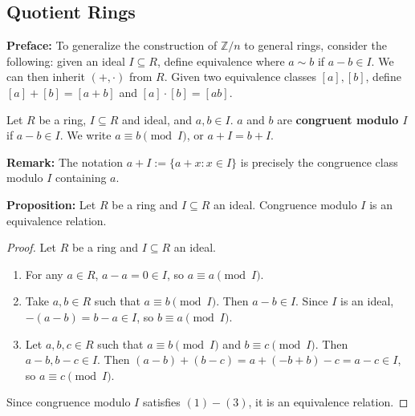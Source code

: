 \documentclass [12pt] {article}
\newcommand{\Z}{\mathbb{Z}}
\newenvironment{definition}[1]{\begin{tcolorbox}[title={Definition: #1},colback=blue!5!white,colframe=black!75!blue]}{\end{tcolorbox}}
\renewcommand{\bf}[1]{\textbf{{#1}}}
\begin{document}
\subsection{Quotient Rings}
\bf{Preface:} To generalize the construction of $\Z/n$ to general rings, consider the following:
given an ideal $I \subseteq R$, define equivalence where $a \sim b$ if $a - b \in I$. We
can then inherit $(+, \cdot)$ from $R$. Given two equivalence classes $[a], [b]$, define
$[a] + [b] = [a + b]$ and $[a] \cdot [b] = [ab]$.
\begin{definition}{Congruent Modulo $I$}
    Let $R$ be a ring, $I \subseteq R$ and ideal, and $a, b \in I$. $a$ and $b$ are \bf{congruent
    modulo $I$} if $a - b \in I$. We write $a \equiv b \pmod{I}$, or $a + I = b + I$.
    \vspace{0.5em}

    \bf{Remark:} The notation $a + I := \{ a + x : x \in I \}$ is precisely the congruence class modulo
    $I$ containing $a$.
\end{definition}
\bf{Proposition:} Let $R$ be a ring and $I \subseteq R$ an ideal. Congruence modulo $I$ is an
equivalence relation.
\begin{proof}
    Let $R$ be a ring and $I \subseteq R$ an ideal.
    \begin{enumerate}[label=(\arabic*)]
        \item For any $a \in R$, $a - a = 0 \in I$, so $a \equiv a \pmod{I}$.
        \item Take $a, b \in R$ such that $a \equiv b \pmod{I}$. Then $a - b \in I$. Since $I$ is an
            ideal, $-(a - b) = b - a \in I$, so $b \equiv a \pmod{I}$.
        \item Let $a, b, c \in R$ such that $a \equiv b \pmod{I}$ and $b \equiv c \pmod{I}$. Then
            $a - b, b - c \in I$. Then $(a - b) + (b - c) = a + (-b + b) - c = a - c \in I$, so
            $a \equiv c \pmod{I}$.
    \end{enumerate}
    Since congruence modulo $I$ satisfies $(1)-(3)$, it is an equivalence relation.
\end{proof}
\end{document}
